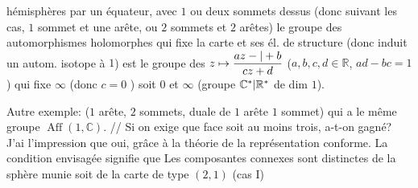 hémisphères par un équateur, avec $1$ ou
deux sommets dessus (donc suivant les
cas, $1$ sommet et une arête, ou $2$ sommets
et $2$ arêtes) le groupe des automorphismes
holomorphes qui fixe la carte et ses
él. de structure (donc induit un
autom. isotope à $1$) est le groupe des
$z\mapsto\dfrac{az-|+b}{cz+d}$ ($a,b,c,d\in\mathbb{R}$, $ad-bc=1$) qui fixe
$\infty$ (donc $c=0$  )
soit $0$ et $\infty$ (groupe $\mathbb{C}^*|\mathbb{R}^*$ de dim $1$).

Autre exemple:
($1$ arête, $2$ sommets,
duale de $1$ arête $1$ sommet) qui a
le même groupe $\operatorname{Aff}(1,\mathbb{C})$. // Si on exige
que  
face  soit au
moins trois, a-t-on gagné? J'ai
l'impression que oui, grâce à la
théorie de la représentation conforme.
La condition envisagée signifie que
Les composantes connexes sont 
distinctes de la sphère munie
soit de la carte de type $(2,1)$ (cas I)
